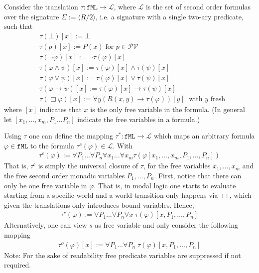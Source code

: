 \documentclass[11pt,a4paper]{article}
\newcommand{\all}{\Box}
\begin{document}
Consider the translation $\tau : \mathtt{fML} \to \mathcal{L}$, where $\mathcal{L}$ is the set of second order formulas over the signature $\Sigma := \langle R/2 \rangle$, i.e. a signature with a single two-ary predicate, such that
\begin{equation*}
\begin{split}
&\tau(\bot)[x] := \bot \\
&\tau(p)[x] := P(x) \; \text{for } p \in \mathcal{PV} \\
&\tau(\neg \varphi)[x] := \neg \tau(\varphi)[x] \\
&\tau(\varphi \land \psi)[x]:= \tau(\varphi)[x]\land \tau(\psi)[x] \\
&\tau(\varphi \lor \psi)[x]:= \tau(\varphi)[x]\lor \tau(\psi)[x] \\
&\tau(\varphi \to \psi)[x] := \tau(\varphi)[x]\to \tau(\psi)[x] \\
&\tau(\all \varphi)[x] := \forall y (R(x,y) \to \tau(\varphi))[y] \; \text{ with } y \text{ fresh}
\end{split}
\end{equation*}
where $[x]$ indicates that $x$ is the only free variable in the formula. 
(In general let $[x_1 ,\dots,x_m , P_1 \dots P_n]$ indicate the free variables in a formula.)


Using $\tau$ one can define the mapping  $\tau^*: \mathtt{fML} \to \mathcal{L}$ which maps an arbitrary formula $\varphi \in \mathtt{fML} $ to the formula $ \tau^c(\varphi) \in \mathcal{L}$. With 
\begin{equation*}
\begin{split}
\tau^c(\varphi) :=\forall P_1 \dots \forall P_n \forall x_1 \dots \forall x_m\tau(\varphi[x_1, \dots ,x_m, P_1 ,\dots , P_n])
\end{split}
\end{equation*}
That is, $\tau^c$ is simply the universal closure of $\tau$, for the free variables $x_1, \dots, x_m$ and the free second order monadic variables $P_1 ,\dots , P_n $. 
First, notice that there can only be one free variable in $\varphi$. That is, in modal logic one starts to evaluate starting from a specific world and a world transition only happens via $\all$, which given the translations only introduces bound variables. Hence, 
\begin{equation*}
\begin{split}
\tau^c(\varphi) :=\forall P_1 \dots \forall P_n \forall x \; \tau(\varphi)[x, P_1 ,\dots , P_n]
\end{split}
\end{equation*}
Alternatively, one can view $s$ as free variable and only consider the following mapping
\begin{equation*}
\begin{split}
\tau^o(\varphi)[x] :=\forall P_1 \dots \forall P_n  \; \tau(\varphi)[x, P_1 ,\dots , P_n]
\end{split}
\end{equation*}
Note: For the sake of readability free predicate variables are suppressed if not required.
\end{document}
